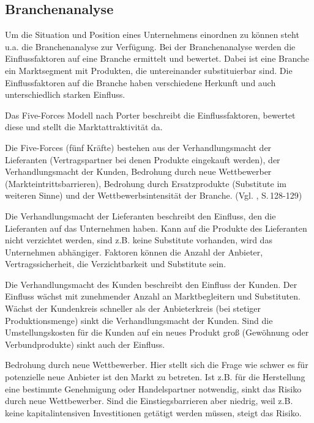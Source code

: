 \subsection{Branchenanalyse} 
    Um die Situation und Position eines Unternehmens einordnen zu können steht u.a. die Branchenanalyse zur Verfügung.
    Bei der Branchenanalyse werden die Einflussfaktoren auf eine Branche ermittelt und bewertet. Dabei ist eine Branche
    ein Marktsegment mit Produkten, die untereinander substituierbar sind. Die Einflussfaktoren auf die Branche haben
    verschiedene Herkunft und auch unterschiedlich starken Einfluss.

    \noindent
    Das Five-Forces Modell nach Porter beschreibt die Einflussfaktoren, bewertet diese und stellt die Marktattraktivität
    da.

    \noindent
    Die Five-Forces (fünf Kräfte) bestehen aus der Verhandlungsmacht der Lieferanten (Vertragspartner bei denen Produkte
    eingekauft werden), der Verhandlungsmacht der Kunden, Bedrohung durch neue Wettbewerber (Markteintrittsbarrieren),
    Bedrohung durch Ersatzprodukte (Substitute im weiteren Sinne) und der Wettbewerbsintensität der Branche.
    (Vgl. \cite{Gamayanto2005}, S.\,128-129)

    \noindent
    Die Verhandlungsmacht der Lieferanten beschreibt den Einfluss, den die Lieferanten auf das Unternehmen haben. Kann
    auf die Produkte des Lieferanten nicht verzichtet werden, sind z.B. keine Substitute vorhanden, wird das Unternehmen
    abhängiger. Faktoren können die Anzahl der Anbieter, Vertragssicherheit, die Verzichtbarkeit und Substitute sein.

    \noindent
    Die Verhandlungsmacht des Kunden beschreibt den Einfluss der Kunden. Der Einfluss wächst mit zunehmender Anzahl an
    Marktbegleitern und Substituten. Wächst der Kundenkreis schneller als der Anbieterkreis (bei stetiger
    Produktionsmenge) sinkt die Verhandlungsmacht der Kunden. Sind die Umstellungskosten für die Kunden auf ein neues
    Produkt groß (Gewöhnung oder Verbundprodukte) sinkt auch der Einfluss.

    \noindent
    Bedrohung durch neue Wettbewerber. Hier stellt sich die Frage wie schwer es für potenzielle neue Anbieter ist den
    Markt zu betreten. Ist z.B. für die Herstellung eine bestimmte Genehmigung oder Handelspartner notwendig, sinkt das
    Risiko durch neue Wettbewerber. Sind die Einstiegsbarrieren aber niedrig, weil z.B. keine kapitalintensiven
    Investitionen getätigt werden müssen, steigt das Risiko.

